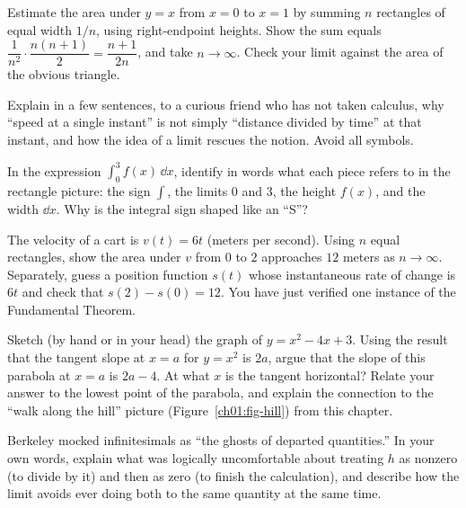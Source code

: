 \begin{exercise}
Estimate the area under $y = x$ from $x=0$ to $x=1$ by summing $n$ rectangles of
equal width $1/n$, using right-endpoint heights. Show the sum equals
$\dfrac{1}{n^2}\cdot\dfrac{n(n+1)}{2} = \dfrac{n+1}{2n}$, and take $n\to\infty$.
Check your limit against the area of the obvious triangle.
\end{exercise}

\begin{exercise}
Explain in a few sentences, to a curious friend who has not taken calculus, why
``speed at a single instant'' is not simply ``distance divided by time'' at that
instant, and how the idea of a limit rescues the notion. Avoid all symbols.
\end{exercise}

\begin{exercise}
In the expression $\displaystyle\int_0^3 f(x)\,\dd x$, identify in words what each
piece refers to in the rectangle picture: the sign $\int$, the limits $0$ and
$3$, the height $f(x)$, and the width $\dd x$. Why is the integral sign shaped
like an ``S''?
\end{exercise}

\begin{exercise}
The velocity of a cart is $v(t) = 6t$ (meters per second). Using $n$ equal
rectangles, show the area under $v$ from $0$ to $2$ approaches $12$ meters as
$n\to\infty$. Separately, guess a position function $s(t)$ whose instantaneous
rate of change is $6t$ and check that $s(2) - s(0) = 12$. You have just verified
one instance of the Fundamental Theorem.
\end{exercise}

\begin{exercise}
Sketch (by hand or in your head) the graph of $y = x^2 - 4x + 3$. Using the
result that the tangent slope at $x=a$ for $y=x^2$ is $2a$, argue that the slope
of this parabola at $x=a$ is $2a - 4$. At what $x$ is the tangent horizontal?
Relate your answer to the lowest point of the parabola, and explain the
connection to the ``walk along the hill'' picture (Figure~\ref{ch01:fig-hill})
from this chapter.
\end{exercise}

\begin{exercise}
Berkeley mocked infinitesimals as ``the ghosts of departed quantities.'' In your
own words, explain what was logically uncomfortable about treating $h$ as nonzero
(to divide by it) and then as zero (to finish the calculation), and describe how
the limit avoids ever doing both to the same quantity at the same time.
\end{exercise}

